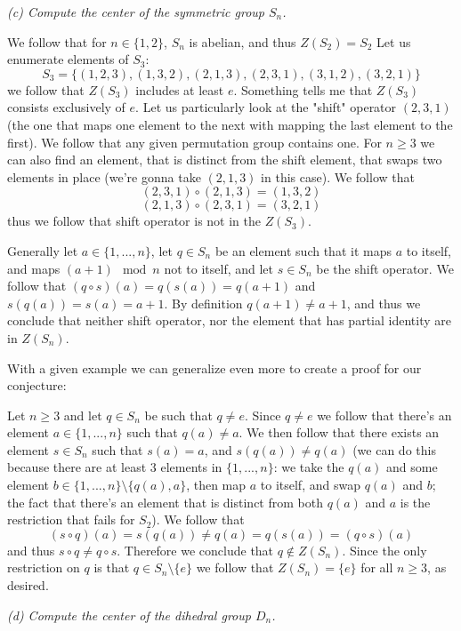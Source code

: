 \documentclass[11pt,oneside,titlepage]{book}
\newcommand{\set}[1]{\{ #1 \}}
\begin{document}
\textit{(c) Compute the center of the symmetric group $S_n$.}

We follow that for $n \in \set{1, 2}$, $S_n$ is abelian, and thus
$Z(S_2) = S_2$ Let us enumerate elements of $S_3$:
$$S_3 = \set{(1, 2, 3), (1, 3, 2), (2, 1, 3),
  (2, 3, 1), (3, 1, 2), (3, 2, 1) } $$ we follow that $Z(S_3)$
includes at least $e$. Something tells me that $Z(S_3)$ consists
exclusively of $e$. Let us particularly look at the "shift" operator
$(2, 3, 1)$ (the one that maps one element to the next with mapping
the last element to the first). We follow that any given permutation
group contains one. For $n \geq 3$ we can also find an element, that
is distinct from the shift element, that swaps two elements in place
(we're gonna take $(2, 1, 3)$ in this case). We follow that
$$(2, 3, 1) \circ (2, 1, 3) = (1, 3, 2)$$
$$(2, 1, 3) \circ (2, 3, 1) = (3, 2, 1)$$
thus we follow that shift operator is not in the $Z(S_3)$.

Generally let $a \in \set{1, ..., n}$, let $q \in S_n$ be an element
such that it maps $a$ to itself, and maps $(a + 1) \mod n$ not to
itself, and let $s \in S_n$ be the shift operator. We follow that $(q
\circ s) (a) = q(s(a)) = q(a + 1)$ and $s(q(a)) = s(a) = a + 1$. By
definition $q(a + 1) \neq a + 1$, and thus we conclude that neither
shift operator, nor the element that has partial identity are in
$Z(S_n)$.

With a given example we can generalize even more to create a proof for
our conjecture:

Let $n \geq 3$ and let $q \in S_n$ be such that $q \neq e$. Since $q
\neq e$ we follow that there's an element $a \in \set{1, ..., n}$ such
that $q(a) \neq a$. We then follow that there exists an element $s \in
S_n$ such that $s(a) = a$, and $s(q(a)) \neq q(a)$ (we can do this
because there are at least 3 elements in $\set{1, ..., n}$: we take
the $q(a)$ and some element $b \in \set{1, ..., n} \setminus
\set{q(a), a}$, then map $a$ to itself, and swap $q(a)$ and $b$; the
fact that there's an element that is distinct from both $q(a)$ and $a$
is the restriction that fails for $S_2$). We follow that
$$(s \circ q) (a) = s(q(a)) \neq q(a) = q(s(a)) = (q \circ s) (a)$$
and thus $s \circ q \neq q \circ s$.  Therefore we conclude that $q
\notin Z(S_n)$. Since the only restriction on $q$ is that $q \in S_n
\setminus \set{e}$ we follow that $Z(S_n) = \set{e}$ for all $n \geq
3$, as desired.

\textit{(d) Compute the center of the dihedral group $D_n$.}
\end{document}
